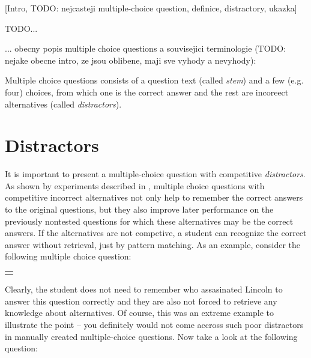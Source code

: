 \documentclass[a4paper, 12pt, twoside]{fithesis2}		%
\renewcommand{\_}{\leavevmode \kern0.0em\vbox{\hrule width0.4em}}
\newcounter{choice}
\renewcommand\thechoice{\Alph{choice}}
\newcommand\choicelabel{\thechoice.}
\newenvironment{choices}%
  {\vspace{0.2em}\list{\choicelabel}%
     {\usecounter{choice}\def\makelabel##1{\hss\llap{##1}}%
       \settowidth{\leftmargin}{W.\hskip\labelsep\hskip 0.01em}%
       \def\choice{%
         \item
       } %
       \labelwidth\leftmargin\advance\labelwidth-\labelsep
       \topsep=0pt
       \partopsep=0pt
     }%
  }%
  {\vspace{-0.7em}\endlist}
\newenvironment{question}
{
  \begin{center}
  \begin{tabular}{p{0.9\textwidth}}
  \vskip 0.05em
}
{
  \\
  \end{tabular}
  \end{center}
}
\newcommand{\sentenceGap}{\rule{1.5cm}{0.4pt}~}
\begin{document}
[Intro, TODO: nejcasteji multiple-choice question, definice, distractory, ukazka]

TODO...

... obecny popis multiple choice questions a souvisejici terminologie (TODO: nejake obecne intro, ze jsou oblibene, maji sve vyhody a nevyhody):

Multiple choice questions consists of a question text (called \textit{stem})
and a few (e.g. four) choices, from which one is the correct answer
and the rest are incoreect alternatives (called \textit{distractors}).



\section{Distractors}
\label{sec:distractors}

It is important to present a multiple-choice question with competitive \textit{distractors}.
As shown by experiments described in \cite{optimizing-multiple-choice}, multiple choice questions with competitive incorrect alternatives not only help to remember the correct answers to the original questions, but they also improve later performance on the previously nontested questions for which these alternatives may be the correct answers. If the alternatives are not competive, a student can recognize the correct answer without retrieval, just by pattern matching. As an example, consider the following multiple choice question:

\begin{exercise}
\caption{Question with noncompetitive alternatives}%
  \begin{question}
  Lincoln was assassinated by \sentenceGap , a Confederate sympathizer.
  \begin{choices}
    \choice Emancipation Proclamation
    \choice John Wilkes Booth
    \choice Illinois
    \choice Department of Agriculture
  \end{choices}
  \end{question}
\end{exercise}

Clearly, the student does not need to remember who assasinated Lincoln to answer this question correctly and they are also not forced to retrieve any knowledge about alternatives.
Of course, this was an extreme example to illustrate the point -- you definitely would not come accross such poor distractors in manually created multiple-choice questions.
Now take a look at the following question:
\end{document}
